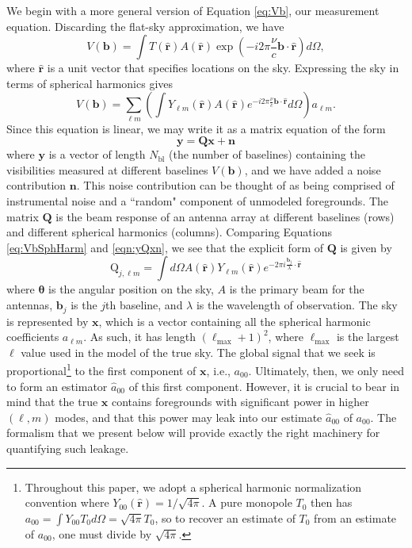 \documentclass[twocolumn,apj,numberedappendix]{emulateapj}
\newcommand{\y}{\mathbf{y}}
\newcommand{\Q}{\mathbf{Q}}
\newcommand{\Nbl}{N_{\textrm{bl}}}
\begin{document}
We begin with a more general version of Equation \eqref{eq:Vb}, our measurement equation. Discarding the flat-sky approximation, we have
\begin{equation}
V(\mathbf{b}) = \int  T(\mathbf{\hat{r}}) A(\mathbf{\hat{r}}) \exp \left( -i 2 \pi \frac{\nu}{c} \mathbf{b} \cdot \mathbf{\hat{r}} \right) d\Omega,
\end{equation}
where $\mathbf{\hat{r}}$ is a unit vector that specifies locations on the sky. Expressing the sky in terms of spherical harmonics gives
\begin{equation}
\label{eq:VbSphHarm}
V(\mathbf{b}) = \sum_{\ell m} \left(  \int  Y_{\ell m} (\mathbf{\hat{r}}) A(\mathbf{\hat{r}}) e^{ -i 2 \pi \frac{\nu}{c} \mathbf{b} \cdot \mathbf{\hat{r}}} d\Omega \right) a_{\ell m}.
\end{equation}
Since this equation is linear, we may write it as a matrix equation of the form
\begin{equation}
\y = \Q \mathbf{x} + \mathbf{n}
\label{eqn:yQxn}
\end{equation}
where $\y$ is a vector of length $\Nbl$ (the number of baselines) containing the visibilities measured at different baselines $V(\mathbf{b})$, and we have added a noise contribution $\mathbf{n}$. This noise contribution can be thought of as being comprised of instrumental noise and a ``random" component of unmodeled foregrounds. The matrix $\Q$ is the beam response of an antenna array at different baselines (rows) and different spherical harmonics (columns). Comparing Equations \eqref{eq:VbSphHarm} and \eqref{eqn:yQxn}, we see that the explicit form of $\Q$ is given by 
\begin{equation}
\textrm{Q}_{j,\ell m} = \int d\Omega A(\mathbf{\hat{r}}) Y_{\ell m}(\mathbf{\hat{r}}) e^{-2\pi i \frac{\mathbf{b_\textit{j}}}{\lambda} \cdot \mathbf{\hat{r}}}
\label{eqn:Qdef}
\end{equation}
where $\boldsymbol \theta$ is the angular position on the sky, $A$ is the primary beam for the antennas, $\mathbf{b_{\textit{j}}}$ is the $j$th baseline, and $\lambda$ is the wavelength of observation. The sky is represented by $\mathbf{x}$, which is a vector containing all the spherical harmonic coefficients $a_{\ell m}$. As such, it has length $(\ell_{\textrm{max}}+1)^2$, where $\ell_{\textrm{max}}$ is the largest $\ell$ value used in the model of the true sky. The global signal that we seek is proportional\footnote{Throughout this paper, we adopt a spherical harmonic normalization convention where $Y_{00} (\mathbf{\hat{r}}) = 1/ \sqrt{4\pi}$. A pure monopole $T_0$ then has $a_{00} = \int Y_{00} T_0 d\Omega = \sqrt{4\pi} T_0$, so to recover an estimate of $T_0$ from an estimate of $a_{00}$, one must divide by $\sqrt{4 \pi}$.} to the first component of $\mathbf{x}$, i.e., $a_{00}$. Ultimately, then, we only need to form an estimator $\hat{a}_{00}$ of this first component. However, it is crucial to bear in mind that the true $\mathbf{x}$ contains foregrounds with significant power in higher $(\ell, m)$ modes, and that this power may leak into our estimate $\hat{a}_{00}$ of $a_{00}$. The formalism that we present below will provide exactly the right machinery for quantifying such leakage.
\end{document}

